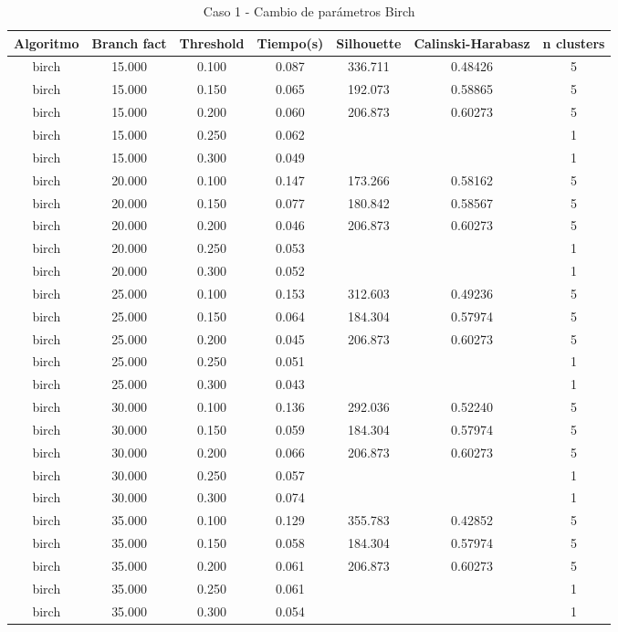 \begin{table}[H]
\centering
\caption{Caso 1 - Cambio de parámetros Birch}
\label{tab:c1_birch}
\begin{tabular}{ccccccc}
\toprule
Algoritmo & Branch fact & Threshold & Tiempo(s) & Silhouette & Calinski-Harabasz & n clusters \\
\midrule
birch & 15.000 & 0.100 & 0.087 & 336.711 & 0.48426 & 5 \\
birch & 15.000 & 0.150 & 0.065 & 192.073 & 0.58865 & 5 \\
birch & 15.000 & 0.200 & 0.060 & 206.873 & 0.60273 & 5 \\
birch & 15.000 & 0.250 & 0.062 &  &  & 1 \\
birch & 15.000 & 0.300 & 0.049 &  &  & 1 \\
birch & 20.000 & 0.100 & 0.147 & 173.266 & 0.58162 & 5 \\
birch & 20.000 & 0.150 & 0.077 & 180.842 & 0.58567 & 5 \\
birch & 20.000 & 0.200 & 0.046 & 206.873 & 0.60273 & 5 \\
birch & 20.000 & 0.250 & 0.053 &  &  & 1 \\
birch & 20.000 & 0.300 & 0.052 &  &  & 1 \\
birch & 25.000 & 0.100 & 0.153 & 312.603 & 0.49236 & 5 \\
birch & 25.000 & 0.150 & 0.064 & 184.304 & 0.57974 & 5 \\
birch & 25.000 & 0.200 & 0.045 & 206.873 & 0.60273 & 5 \\
birch & 25.000 & 0.250 & 0.051 &  &  & 1 \\
birch & 25.000 & 0.300 & 0.043 &  &  & 1 \\
birch & 30.000 & 0.100 & 0.136 & 292.036 & 0.52240 & 5 \\
birch & 30.000 & 0.150 & 0.059 & 184.304 & 0.57974 & 5 \\
birch & 30.000 & 0.200 & 0.066 & 206.873 & 0.60273 & 5 \\
birch & 30.000 & 0.250 & 0.057 &  &  & 1 \\
birch & 30.000 & 0.300 & 0.074 &  &  & 1 \\
birch & 35.000 & 0.100 & 0.129 & 355.783 & 0.42852 & 5 \\
birch & 35.000 & 0.150 & 0.058 & 184.304 & 0.57974 & 5 \\
birch & 35.000 & 0.200 & 0.061 & 206.873 & 0.60273 & 5 \\
birch & 35.000 & 0.250 & 0.061 &  &  & 1 \\
birch & 35.000 & 0.300 & 0.054 &  &  & 1 \\
\bottomrule
\end{tabular}
\end{table}

